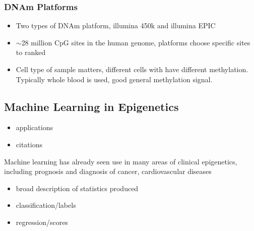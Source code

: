\documentclass{article}
\begin{document}

\subsubsection{DNAm Platforms}
\begin{itemize}
    \item Two types of DNAm platform, illumina 450k and illumina EPIC
    \item \(\sim\)28 million CpG sites in the human genome, platforms choose specific sites to ranked
    \item Cell type of sample matters, different cells with have different methylation. Typically whole blood is used, good general methylation signal.
\end{itemize}

\subsection{Machine Learning in Epigenetics}
\begin{itemize}
    \item applications
    \item citations
\end{itemize}
Machine learning has already seen use in many areas of clinical epigenetics, including prognosis and diagnosis of cancer, cardiovascular diseases
\begin{itemize}
    \item broad description of statistics produced
    \item classification/labels
    \item regression/scores
\end{itemize}
\end{document}
